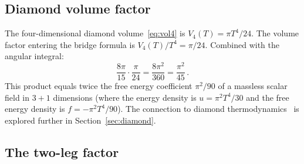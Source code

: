 \documentclass[12pt,a4paper]{article}
\theoremstyle{plain}
\theoremstyle{definition}
\theoremstyle{remark}
\begin{document}
\subsection{Diamond volume factor}
\label{sec:volume}

The four-dimensional diamond volume~\eqref{eq:vol4} is
$V_4(T) = \pi T^4/24$.  The volume factor entering the bridge
formula is $V_4(T)/T^4 = \pi/24$.  Combined with the angular
integral:
\begin{equation}\label{eq:angvol}
  \frac{8\pi}{15} \cdot \frac{\pi}{24}
  = \frac{8\pi^2}{360} = \frac{\pi^2}{45}\,.
\end{equation}
This product equals twice the free energy coefficient
$\pi^2/90$ of a massless scalar field in $3{+}1$ dimensions
(where the energy density is $u = \pi^2 T^4/30$ and the free
energy density is $f = -\pi^2 T^4/90$).  The connection to
diamond thermodynamics~\cite{MartRov:2003} is explored further
in Section~\ref{sec:diamond}.

\subsection{The two-leg factor}
\label{sec:factor4}
\end{document}
